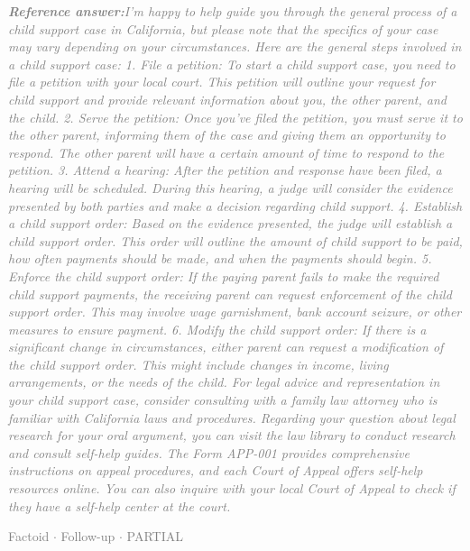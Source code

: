 \documentclass[a4paper,11pt]{article}
\begin{document}
\begin{refanswerenv}
{\footnotesize\textit{\textcolor{gray}{\textbf{Reference answer:}\enspace I'm happy to help guide you through the general process of a child support case in California, but please note that the specifics of your case may vary depending on your circumstances. Here are the general steps involved in a child support case:
1. File a petition: To start a child support case, you need to file a petition with your local court. This petition will outline your request for child support and provide relevant information about you, the other parent, and the child.
2. Serve the petition: Once you've filed the petition, you must serve it to the other parent, informing them of the case and giving them an opportunity to respond. The other parent will have a certain amount of time to respond to the petition.
3. Attend a hearing: After the petition and response have been filed, a hearing will be scheduled. During this hearing, a judge will consider the evidence presented by both parties and make a decision regarding child support.
4. Establish a child support order: Based on the evidence presented, the judge will establish a child support order. This order will outline the amount of child support to be paid, how often payments should be made, and when the payments should begin.
5. Enforce the child support order: If the paying parent fails to make the required child support payments, the receiving parent can request enforcement of the child support order. This may involve wage garnishment, bank account seizure, or other measures to ensure payment.
6. Modify the child support order: If there is a significant change in circumstances, either parent can request a modification of the child support order. This might include changes in income, living arrangements, or the needs of the child.
For legal advice and representation in your child support case, consider consulting with a family law attorney who is familiar with California laws and procedures.
Regarding your question about legal research for your oral argument, you can visit the law library to conduct research and consult self-help guides. The Form APP-001 provides comprehensive instructions on appeal procedures, and each Court of Appeal offers self-help resources online. You can also inquire with your local Court of Appeal to check if they have a self-help center at the court.}}}
\end{refanswerenv}
\vspace{0.5em}
\hfill{\tiny\textcolor{gray}{Factoid $\cdot$ Follow-up $\cdot$ PARTIAL}}
\end{document}
